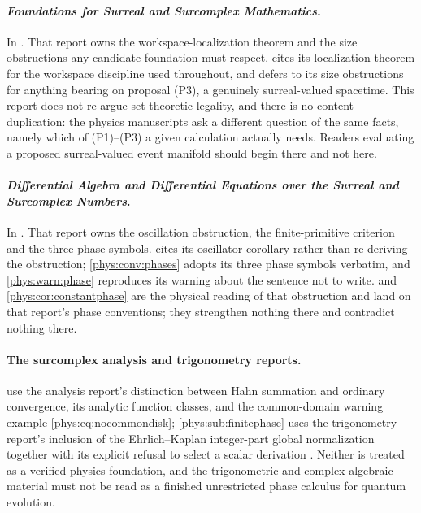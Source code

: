 \documentclass[11pt,letterpaper]{article}
\numberwithin{equation}{section}
\theoremstyle{definition}
\theoremstyle{remark}
\begin{document}
\paragraph{\emph{Foundations for Surreal and Surcomplex Mathematics}.}
In .
That report owns the workspace-localization theorem and the size obstructions
any candidate foundation must respect.  cites its
localization theorem for the workspace discipline used throughout, and defers
to its size obstructions for anything bearing on proposal (P3), a genuinely
surreal-valued spacetime. This report does not re-argue set-theoretic legality,
and there is no content duplication: the physics manuscripts ask a different
question of the same facts, namely which of (P1)--(P3) a given calculation
actually needs. Readers evaluating a proposed surreal-valued event manifold
should begin there and not here.

\paragraph{\emph{Differential Algebra and Differential Equations over the
Surreal and Surcomplex Numbers}.}
In .
That report owns the oscillation obstruction, the finite-primitive criterion
and the three phase symbols.  cites its oscillator
corollary rather than re-deriving the obstruction;
\cref{phys:conv:phases} adopts its three phase symbols verbatim, and
\cref{phys:warn:phase} reproduces its warning about the sentence not to write.
 and \cref{phys:cor:constantphase} are the physical
reading of that obstruction and land on that report's phase conventions; they
strengthen nothing there and contradict nothing there.

\paragraph{The surcomplex analysis and trigonometry reports.}
 use the analysis report's
distinction between Hahn summation and ordinary convergence, its analytic
function classes, and the common-domain warning example
\eqref{phys:eq:nocommondisk}; \cref{phys:sub:finitephase} uses the
trigonometry report's inclusion of the Ehrlich--Kaplan integer-part global
normalization together with its explicit refusal to select a scalar derivation
\cite{phys:RepoAnalysis,phys:RepoTrig}. Neither is treated as a verified
physics foundation, and the trigonometric and complex-algebraic material must
not be read as a finished unrestricted phase calculus for quantum evolution.
\end{document}
